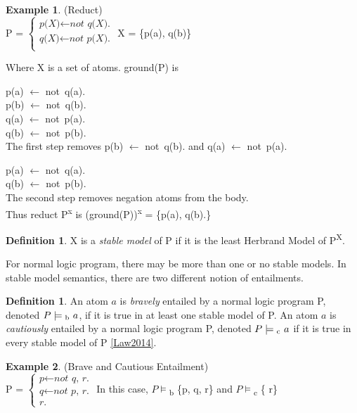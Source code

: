 \documentclass[11pt,twoside]{report}
\theoremstyle{plain}
\theoremstyle{definition}
\newtheorem{defn}[thm]{Definition} %
\newtheorem{examp}{Example}[section]
\begin{document}
\begin{examp} \normalfont (Reduct) \\

P = $\begin{cases}
	\textit{p(X)}  \leftarrow \textit{not q(X).} \\
  	\textit{q(X)} \leftarrow \textit{not p(X).} \\
      \end{cases}$  X = \{p(a), q(b)\}

Where X is a set of atoms. ground(P) is

p(a)  $\leftarrow$ not\ q(a). \\
p(b)  $\leftarrow$ not\ q(b). \\
q(a) $\leftarrow$ not\ p(a). \\
q(b) $\leftarrow$ not\ p(b). \\

 The first step removes p(b)  $\leftarrow$ not\ q(b). and q(a) $\leftarrow$ not\ p(a).

p(a)  $\leftarrow$ not\ q(a). \\
q(b) $\leftarrow$ not\ p(b). \\

The second step removes negation atoms from the body. \\
Thus reduct P\textsuperscript{x} is (ground(P))\textsuperscript{x} =  \{p(a), q(b).\}
\label{reduct}
\end{examp}

\begin{defn}
X is a \textit{stable model} of P if it is the least Herbrand Model of P\textsuperscript{X}.
\end{defn}

For normal logic program, there may be more than one or no stable models. In stable model semantics,  there are two different notion of entailments.
\begin{defn}
An atom $a$ is \textit{bravely} entailed by a normal logic program P, denoted $ P \models\textsubscript{b} \ a$, if it is true in at least one stable model of P. An atom $a$ is \textit{cautiously} entailed by a normal logic program P, denoted $ P \models\textsubscript{c} \ a$ if it is true in every stable model of P \ref{Law2014}.
\end{defn}

\begin{examp} \normalfont (Brave and Cautious Entailment) \\

P = $\begin{cases}
	\textit{p}  \leftarrow \textit{not q, r.} \\
  	\textit{q} \leftarrow \textit{not p, r.} \\
	\textit{r.}
      \end{cases}$ 
In this case, $P\models$\textsubscript{b} \{p, q, r\} and $P\models$\textsubscript{c} \{ r\}
\end{examp}
\end{document}
